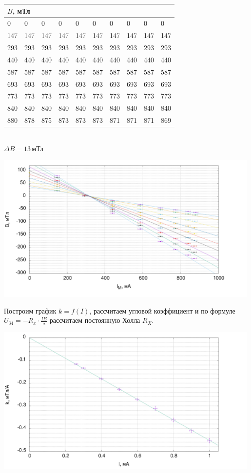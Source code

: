 \begin{center}
\begin{tabular}{|l|l|l|l|l|l|l|l|l|l|}
\hline
\multicolumn{10}{|l|}{$B$, мТл}  \\ \hline
0 & 0 & 0 & 0 & 0 & 0 & 0 & 0 & 0 & 0 \\ \hline
147 & 147 & 147 & 147 & 147 & 147 & 147 & 147 & 147 & 147 \\ \hline
293 & 293 & 293 & 293 & 293 & 293 & 293 & 293 & 293 & 293 \\ \hline
440 & 440 & 440 & 440 & 440 & 440 & 440 & 440 & 440 & 440 \\ \hline
587 & 587 & 587 & 587 & 587 & 587 & 587 & 587 & 587 & 587 \\ \hline
693 & 693 & 693 & 693 & 693 & 693 & 693 & 693 & 693 & 693 \\ \hline
773 & 773 & 773 & 773 & 773 & 773 & 773 & 773 & 773 & 773 \\ \hline
840 & 840 & 840 & 840 & 840 & 840 & 840 & 840 & 840 & 840 \\ \hline
880 & 878 & 875 & 873 & 873 & 873 & 871 & 871 & 871 & 869 \\ \hline
\end{tabular}\\[0.4cm]
$\Delta B = 13\,\text{мТл}$
\end{center}

\begin{center}
\includegraphics[width=0.99\textwidth]{data.png}
\end{center}
Построим график $k = f(I)$, рассчитаем угловой коэффициент и по формуле $U_{34} = -R_x \cdot \frac{IB}{a}$ рассчитаем постоянную Холла $R_X$.

\begin{center}
\includegraphics[width=0.99\textwidth]{sum.png}
\end{center}

